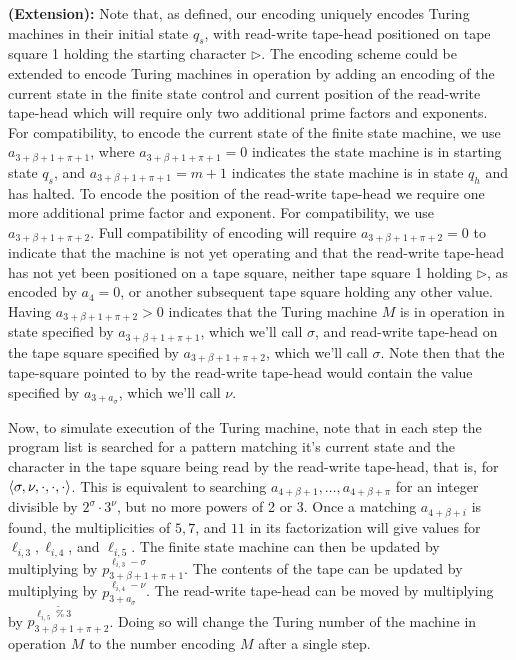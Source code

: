 \noindent \textbf{(Extension):} Note that, as defined, our encoding uniquely encodes Turing machines in their initial state $q_s$, with read-write tape-head positioned on tape square 1 holding the starting character $\triangleright$.  The encoding scheme could be extended to encode Turing machines in operation by adding an encoding of the current state in the finite state control and current position of the read-write tape-head which will require only two additional prime factors and exponents.  For compatibility, to encode the current state of the finite state machine, we use $a_{3+\beta+1+\pi+1}$, where $a_{3+\beta+1+\pi+1} = 0$ indicates the state machine is in starting state $q_s$, and $a_{3+\beta+1+\pi+1} = m+1$ indicates the state machine is in state $q_h$ and has halted.  To encode the position of the read-write tape-head we require one more additional prime factor and exponent. For compatibility, we use $a_{3+\beta+1+\pi+2}$.  Full compatibility of encoding will require $a_{3+\beta+1+\pi+2}=0$ to indicate that the machine is not yet operating and that the read-write tape-head has not yet been positioned on a tape square, neither tape square 1 holding $\triangleright$, as encoded by $a_4=0$, or another subsequent tape square holding any other value.  Having $a_{3+\beta+1+\pi+2}>0$ indicates that the Turing machine $M$ is in operation in state specified by $a_{3+\beta+1+\pi+1}$, which we'll call $\sigma$, and read-write tape-head on the tape square specified by $a_ {3+\beta+1+\pi+2}$, which we'll call $\sigma$.  Note then that the tape-square pointed to by the read-write tape-head would contain the value specified by $a_{3+a_ {\sigma}}$, which we'll call $\nu$.

Now, to simulate execution of the Turing machine, note that in each step the program list is searched for a pattern matching it's current state and the character in the tape square being read by the read-write tape-head, that is, for $\braket{\sigma,\nu,\cdot,\cdot,\cdot}$.  This is equivalent to searching $a_{4+\beta+1},\ldots,a_{4+\beta+\pi}$ for an integer divisible by $2^{\sigma}\cdot 3^{\nu}$, but no more powers of 2 or 3. Once a matching $a_{4+\beta+i}$ is found, the multiplicities of $5, 7$, and $11$ in its factorization will give values for $\ell_{i,3}, \ell_{i,4}$, and $\ell_{i,5}$. The finite state machine can then be updated by multiplying by $p_{3+\beta+1+\pi+1}^{\ell_{i,3}-\sigma}$.  The contents of the tape can be updated by multiplying by $p_{3+a_\sigma}^{\ell_{i,4}-\nu}$.  The read-write tape-head can be moved by multiplying by $p_{3+\beta+1+\pi+2}^{\ell_{i,5}~\widetilde{\%}~3 }$.  Doing so will change the Turing number of the machine in operation $M$ to the number encoding $M$ after a single step.

